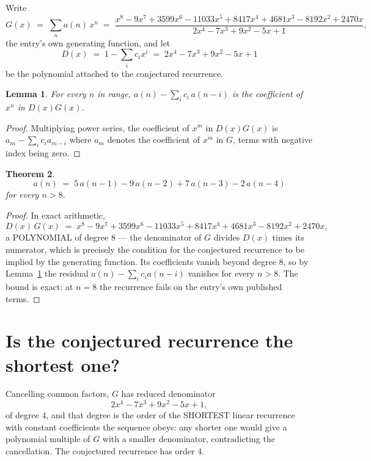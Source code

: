 \documentclass[11pt,a4paper]{article}
\theoremstyle{plain}
\newtheorem{theorem}{Theorem}
\newtheorem{lemma}[theorem]{Lemma}
\theoremstyle{definition}
\begin{document}
Write
\[
G(x)\;=\;\sum_{n}a(n)\,x^{n}\;=\;\frac{x^{8} - 9 x^{7} + 3599 x^{6} - 11033 x^{5} + 8417 x^{4} + 4681 x^{3} - 8192 x^{2} + 2470 x}{2 x^{4} - 7 x^{3} + 9 x^{2} - 5 x + 1},
\]
the entry's own generating function, and let
\[
D(x)\;=\;1-\sum_i c_i x^{i}\;=\;2 x^{4} - 7 x^{3} + 9 x^{2} - 5 x + 1
\]
be the polynomial attached to the conjectured recurrence.

\begin{lemma}\label{lem:key}
For every $n$ in range, $a(n)-\sum_i c_i\,a(n-i)$ is the coefficient of $x^{n}$ in
$D(x)G(x)$.
\end{lemma}

\begin{proof}
Multiplying power series, the coefficient of $x^{m}$ in $D(x)G(x)$ is
$a_m-\sum_i c_i a_{m-i}$ where $a_m$ denotes the coefficient of $x^{m}$ in $G$, terms with
negative index being zero.
\end{proof}

\begin{theorem}
\[
a(n)\;=\;5\,a(n-1) - 9\,a(n-2) + 7\,a(n-3) - 2\,a(n-4)
\]
for every $n>8$.
\end{theorem}

\begin{proof}
In exact arithmetic,
\[
D(x)\,G(x)\;=\;x^{8} - 9 x^{7} + 3599 x^{6} - 11033 x^{5} + 8417 x^{4} + 4681 x^{3} - 8192 x^{2} + 2470 x,
\]
a POLYNOMIAL of degree $8$ --- the denominator of $G$ divides $D(x)$ times its numerator,
which is precisely the condition for the conjectured recurrence to be implied by the
generating function. Its coefficients vanish beyond degree $8$, so by
Lemma~\ref{lem:key} the residual $a(n)-\sum_ic_ia(n-i)$ vanishes for every
$n>8$. The bound is exact: at $n=8$ the recurrence fails on the entry's own published terms.
\end{proof}

\section{Is the conjectured recurrence the shortest one?}

Cancelling common factors, $G$ has reduced denominator
\[
2 x^{4} - 7 x^{3} + 9 x^{2} - 5 x + 1,
\]
of degree $4$, and that degree is the order of the SHORTEST linear recurrence with
constant coefficients the sequence obeys: any shorter one would give a polynomial multiple of
$G$ with a smaller denominator, contradicting the cancellation. The conjectured recurrence has
order $4$.
\end{document}
